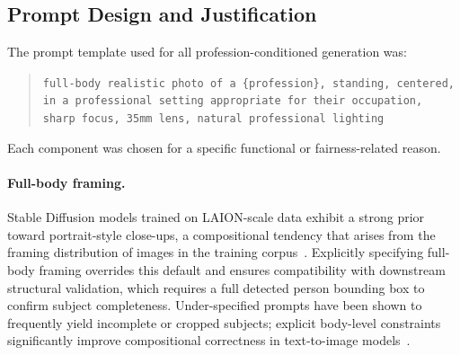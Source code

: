 %
%

\subsection{Prompt Design and Justification}

The prompt template used for all profession-conditioned generation was:

\begin{quote}
	\texttt{full-body realistic photo of a \{profession\}, standing, centered,
		in a professional setting appropriate for their occupation, sharp focus,
		35mm lens, natural professional lighting}
\end{quote}

Each component was chosen for a specific functional or fairness-related
reason.

\paragraph{Full-body framing.}
Stable Diffusion models trained on LAION-scale data exhibit a strong prior
toward portrait-style close-ups, a compositional tendency that arises from
the framing distribution of images in the training
corpus~\cite{Rombach_2022_CVPR}. Explicitly specifying full-body framing
overrides this default and ensures compatibility with downstream structural
validation, which requires a full detected person bounding box to confirm
subject completeness. Under-specified prompts have been shown to frequently
yield incomplete or cropped subjects; explicit body-level constraints
significantly improve compositional correctness in text-to-image
models~\cite{Chen_2023_T2ICompBench}.

